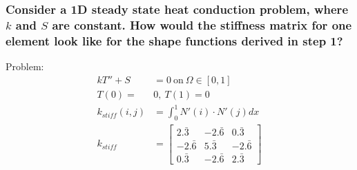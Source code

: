 \subsubsection{ Consider a 1D steady state heat conduction problem, where $k$ and $S$ are constant. How would the stiffness matrix for one element look like for the shape functions derived in step 1?}
Problem:
\begin{align}
    kT'' + S &= 0\ \mathrm{on}\ \Omega \in [0,1]\\
    T(0) = &0,\ T(1) = 0 \\
    k_{stiff}(i,j) &= \int_{0}^{1}{N'(i) \cdot N'(j) dx}\\
    k_{stiff} &= \begin{bmatrix}
    2.\bar{3} & -2.\bar{6} &  0.\bar{3} \\
    -2.\bar{6} &  5.\bar{3} & -2.\bar{6} \\
    0.\bar{3} & -2.\bar{6} &  2.\bar{3}\end{bmatrix}
\end{align}
